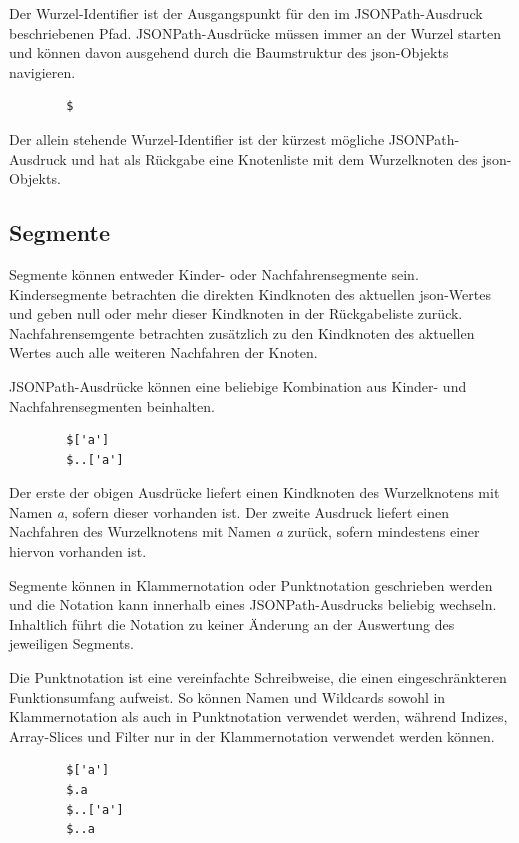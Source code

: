 \documentclass[oneside]{ausarbeitung}
\begin{document}
	Der Wurzel-Identifier ist der Ausgangspunkt für den im JSONPath-Ausdruck beschriebenen Pfad. JSONPath-Ausdrücke müssen immer an der Wurzel starten und können davon ausgehend durch die Baumstruktur des \ac{json}-Objekts navigieren.
	
	\begin{lstlisting}
		$
	\end{lstlisting}
	
	Der allein stehende Wurzel-Identifier ist der kürzest mögliche JSONPath-Ausdruck und hat als Rückgabe eine Knotenliste mit dem Wurzelknoten des \ac{json}-Objekts.
	
	
	
	\subsection{Segmente}
	
	Segmente können entweder Kinder- oder Nachfahrensegmente sein. Kindersegmente betrachten die direkten Kindknoten des aktuellen \ac{json}-Wertes und geben null oder mehr dieser Kindknoten in der Rückgabeliste zurück. Nachfahrensemgente betrachten zusätzlich zu den Kindknoten des aktuellen Wertes auch alle weiteren Nachfahren der Knoten.
	
	JSONPath-Ausdrücke können eine beliebige Kombination aus Kinder- und Nachfahrensegmenten beinhalten.
	
	\begin{lstlisting}
		$['a']
		$..['a']
	\end{lstlisting}
	
	Der erste der obigen Ausdrücke liefert einen Kindknoten des Wurzelknotens mit Namen \textit{a}, sofern dieser vorhanden ist. Der zweite Ausdruck liefert einen Nachfahren des Wurzelknotens mit Namen \textit{a} zurück, sofern mindestens einer hiervon vorhanden ist.
	
	Segmente können in Klammernotation oder Punktnotation geschrieben werden und die Notation kann innerhalb eines JSONPath-Ausdrucks beliebig wechseln. Inhaltlich führt die Notation zu keiner Änderung an der Auswertung des jeweiligen Segments.
	
	Die Punktnotation ist eine vereinfachte Schreibweise, die einen eingeschränkteren Funktionsumfang aufweist. So können Namen und Wildcards sowohl in Klammernotation als auch in Punktnotation verwendet werden, während Indizes, Array-Slices und Filter nur in der Klammernotation verwendet werden können.
	
	\begin{lstlisting}
		$['a']
		$.a
		$..['a']
		$..a
	\end{lstlisting}
	
\end{document}
